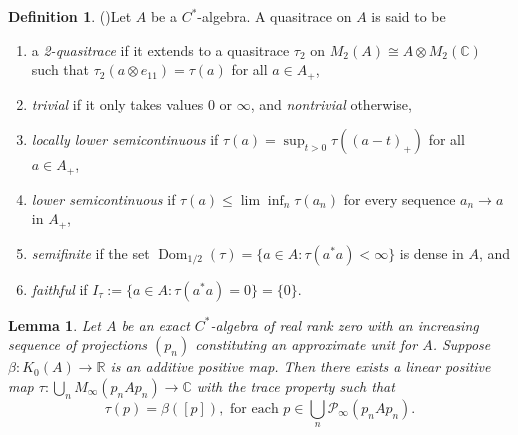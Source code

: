 \documentclass[a4paper, 12pt]{amsart}
\numberwithin{equation}{section}
\newcounter{theorem}
\newtheorem{lemma}[theorem]{Lemma}
\theoremstyle{remark}
\theoremstyle{definition}
\newtheorem{defn}[theorem]{Definition}
\begin{document}
\begin{defn}({\cite[Definition 2.22]{MR2032998}})\label{def.2.quasitrace}
Let $A$ be a $C^*$-algebra. A quasitrace on $A$ is said to be
\begin{enumerate}
\item a \emph{2-quasitrace} if it extends to a quasitrace $\tau_2$ on
    $M_2(A)\cong A\otimes M_2({\mathbb{C}})$ such that $\tau_2(a\otimes e_{11})=\tau(a)$ for
    all $a\in A_+$,
\item \emph{trivial} if it only takes values $0$ or $\infty$, and
    \emph{nontrivial} otherwise,
\item \emph{locally lower semicontinuous} if $\tau(a)=
    \sup_{t>0}\tau((a-t)_+)$ for all $a\in A_+$,
\item \emph{lower semicontinuous} if $\tau(a)\leq \lim \inf_n \tau(a_n)$ for
    every sequence $a_n\to a$ in $A_+$,
\item \emph{semifinite} if the set ${\operatorname{Dom}_{1/2}}(\tau)=\{a\in A : \tau(a^*a)<\infty\}$
    is dense in $A$, and
\item \emph{faithful} if $I_\tau:=\{a\in A : \tau(a^*a)=0\}=\{0\}$.
\end{enumerate}
\end{defn}

\begin{lemma}\label{lem.extend.beta}
Let $A$ be an exact $C^*$-algebra of real rank zero with an increasing sequence of
projections $(p_n)$ constituting an approximate unit for $A$. Suppose $\beta \colon
K_0(A)\to {\mathbb{R}}$ is an additive positive map. Then there exists a linear positive map
$\tau\colon \bigcup_nM_\infty(p_nAp_n)\to {\mathbb{C}}$ with the trace property such that
$$\tau(p)=\beta([p]), \textrm{ for each }p\in \bigcup_n{\mathcal{P}}_\infty(p_nAp_n).$$
\end{lemma}
\end{document}
